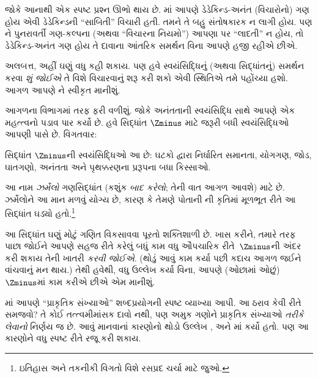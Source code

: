 જોકે આનાથી એક સ્પષ્ટ પ્રશ્ન ઊભો થાય છે.
માં આપણે
ડેડેકિન્ડ-અનંત (વિચારોનો) ગણ હોય એવી ડેડેકિન્ડની “સાબિતી”
વિચારી હતી. તમને તે બહુ સંતોષકારક ન લાગી હોય. પણ
\stagesinf{}ને પુનરાવર્તી ગણ-કલ્પના (અથવા “વિચારના નિયમો”)
આપણા પર “લાદતી” ન હોય, તો ડેડેકિન્ડ-અનંત ગણ હોય તે દાવાના
આંતરિક સમર્થન વિના આપણે હજી રહીએ છીએ.

અલબત્ત, અહીં ઘણું વધુ કહી શકાય. પણ હવે સ્વયંસિદ્ધિનું
(અથવા સિદ્ધાંતનું) સમર્થન કરવા \emph{શું જોઈએ} તે વિશે
વિચારવાનું શરૂ કરી શકો એવી સ્થિતિએ તમે પહોંચ્યા હશો.
આગળ આપણે \stagesinf{}ને સ્વીકૃત માનીશું.
\endgroup

\begingroup
\makeatletter{}\makeatother

\label{guunit:OLP-0544}


આગળના વિભાગમાં \stagesinf{} તરફ ફરી વળીશું. જોકે અનંતતાની
સ્વયંસિદ્ધિ સાથે આપણે એક મહત્ત્વનો પડાવ પાર કર્યો છે. હવે સિદ્ધાંત
$\Zminus$ માટે જરૂરી બધી સ્વયંસિદ્ધિઓ આપણી પાસે છે. વિગતવાર:

\begin{defn}
સિદ્ધાંત $\Zminus$ની સ્વયંસિદ્ધિઓ આ છે: ઘટકો દ્વારા નિર્ધારિત
સમાનતા, યોગગણ, જોડ, ઘાતગણો, અનંતતા અને પૃથક્કરણના પ્રરૂપના
બધા કિસ્સાઓ.
\end{defn}

આ નામ \emph{ઝર્મેલો} ગણસિદ્ધાંત (કશુંક \emph{બાદ કરેલો};
તેની વાત આગળ આવશે) માટે છે. ઝર્મેલોને આ માન મળવું યોગ્ય છે,
કારણ કે તેમણે પોતાની \citeyear{Zermelo1908Untersuchungen}ની
કૃતિમાં મૂળભૂત રીતે આ સિદ્ધાંત ઘડ્યો હતો.\footnote{ઇતિહાસ અને
તકનીકી વિગતો વિશે રસપ્રદ ચર્ચા માટે \citet[Appendix
A]{Potter2004} જુઓ.}

આ સિદ્ધાંત ઘણું મોટું ગણિત વિકસાવવા પૂરતો શક્તિશાળી છે.
ખાસ કરીને, તમારે  તરફ પાછા જોઈને આપણે
સહજ રીતે કરેલું બધું કામ વધુ ઔપચારિક રીતે~$\Zminus$ની અંદર
કરી શકાય તેની ખાતરી \emph{કરવી જોઈએ}. (થોડું આવું કામ કર્યા
પછી કદાચ આગળ જઈને  વાંચવાનું
મન થાય.) તેથી હવેથી, વધુ ઉલ્લેખ કર્યા વિના, આપણે (ઓછામાં ઓછું)
$\Zminus$માં કામ કરીએ છીએ એમ માનીશું.
\endgroup

\begingroup
\makeatletter{}\makeatother

\label{guunit:OLP-0545}



માં આપણે “પ્રાકૃતિક સંખ્યાઓ”
શબ્દપ્રયોગની સ્પષ્ટ વ્યાખ્યા આપી. આ ઠરાવ કેવી રીતે સમજવો?
તે કોઈ તત્ત્વમીમાંસક દાવો નથી, પણ અમુક ગણોને પ્રાકૃતિક સંખ્યાઓ
\emph{તરીકે લેવાનો} નિર્ણય જ છે. આવું માનવાનાં કારણોનો થોડો
ઉલ્લેખ , 
અને માં કર્યો હતો.
પણ આ કારણોને વધુ સ્પષ્ટ રીતે રજૂ કરી શકાય.

